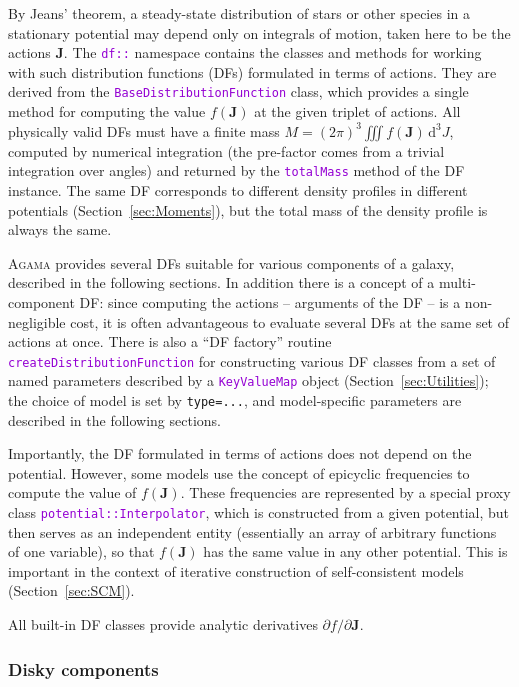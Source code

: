 \documentclass[12pt]{article}
\newcommand{\Agama}{\textsc{Agama}\xspace}
\newcommand{\ttt}[1]{\textcolor{darkviolet}{\texttt{#1}}}
\newcommand{\ppp}[1]{\textcolor{darkolive} {\texttt{#1}}}
\renewcommand{\d}{\mathrm{d}}
\newcommand{\bJ}{\boldsymbol{J}}
\begin{document}
By Jeans' theorem, a steady-state distribution of stars or other species in a stationary potential may depend only on integrals of motion, taken here to be the actions $\bJ$. The \ttt{df::} namespace contains the classes and methods for working with such distribution functions (DFs) formulated in terms of actions. They are derived from the \ttt{BaseDistributionFunction} class, which provides a single method for computing the value $f(\bJ)$ at the given triplet of actions. All physically valid DFs must have a finite mass $M = (2\pi)^3 \iiint f(\bJ)\,\d ^3J$, computed by numerical integration (the pre-factor comes from a trivial integration over angles) and returned by the \ttt{totalMass} method of the DF instance.
The same DF corresponds to different density profiles in different potentials (Section~\ref{sec:Moments}), but the total mass of the density profile is always the same.

\Agama provides several DFs suitable for various components of a galaxy, described in the following sections. In addition there is a concept of a multi-component DF: since computing the actions -- arguments of the DF -- is a non-negligible cost, it is often advantageous to evaluate several DFs at the same set of actions at once.
There is also a ``DF factory'' routine \ttt{createDistributionFunction} for constructing various DF classes from a set of named parameters described by a \ttt{KeyValueMap} object (Section~\ref{sec:Utilities}); the choice of model is set by \ppp{type=...}, and model-specific parameters are described in the following sections.

Importantly, the DF formulated in terms of actions does not depend on the potential. However, some models use the concept of epicyclic frequencies to compute the value of $f(\bJ)$. These frequencies are represented by a special proxy class \ttt{potential::Interpolator}, which is constructed from a given potential, but then serves as an independent entity (essentially an array of arbitrary functions of one variable), so that $f(\bJ)$ has the same value in any other potential. This is important in the context of iterative construction of self-consistent models (Section~\ref{sec:SCM}).

All built-in DF classes provide analytic derivatives $\partial f/\partial \bJ$.

\subsubsection{Disky components}  \label{sec:DFdisk}
\end{document}
